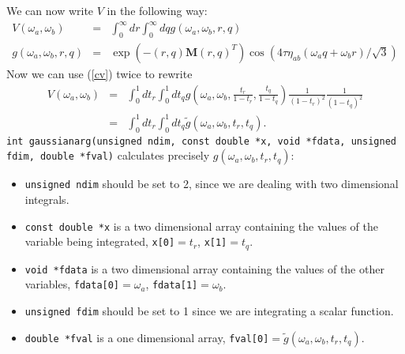 \documentclass[10pt,letterpaper]{article}
\begin{document}
We can now write $V$ in the following way:
\begin{eqnarray}
V(\omega_a,\omega_b)&=& \int_0^{\infty} dr \int_0^{\infty} dq g(\omega_a,\omega_b,r,q)\\
g(\omega_a,\omega_b,r,q)&=&\exp\left(-(r,q) \mathbf{M} (r,q)^T \right) \cos\left(4 \tau \eta_{ab}( \omega_a q+ \omega_b r)/\sqrt{3}  \right)\nonumber
\end{eqnarray}
Now we can use (\ref{cv}) twice to rewrite
\begin{eqnarray}\label{int}
V(\omega_a,\omega_b)&=& \int_0^{1} dt_r \int_0^{1} dt_q g\left(\omega_a,\omega_b,\frac{t_r}{1-t_r},\frac{t_q}{1-t_q}\right) \frac{1}{(1-t_r)^2} \frac{1}{(1-t_q)^2}\\
&=&\int_0^{1} dt_r \int_0^{1} dt_q \tilde g(\omega_a,\omega_b,t_r,t_q).
\end{eqnarray}
\verb|int gaussianarg(unsigned ndim, const double *x, void *fdata, unsigned fdim, double *fval)| calculates precisely $g(\omega_a,\omega_b,t_r,t_q)$:
\begin{itemize}
\item  \verb|unsigned ndim| should be set to 2, since we are dealing with two dimensional integrals.
\item  \verb|const double *x| is a two dimensional array containing the values of the variable being integrated, \verb|x[0]|$=t_r$, \verb|x[1]|$=t_q$.
\item  \verb|void *fdata| is a two dimensional array containing the values of the other variables, \verb|fdata[0]|$=\omega_a$, \verb|fdata[1]|$=\omega_b$.
\item  \verb|unsigned fdim| should be set to 1 since we are integrating a scalar function.
\item  \verb|double *fval| is a one dimensional array, \verb|fval[0]|$=\tilde g(\omega_a,\omega_b,t_r,t_q)$.
\end{itemize}
\end{document}
